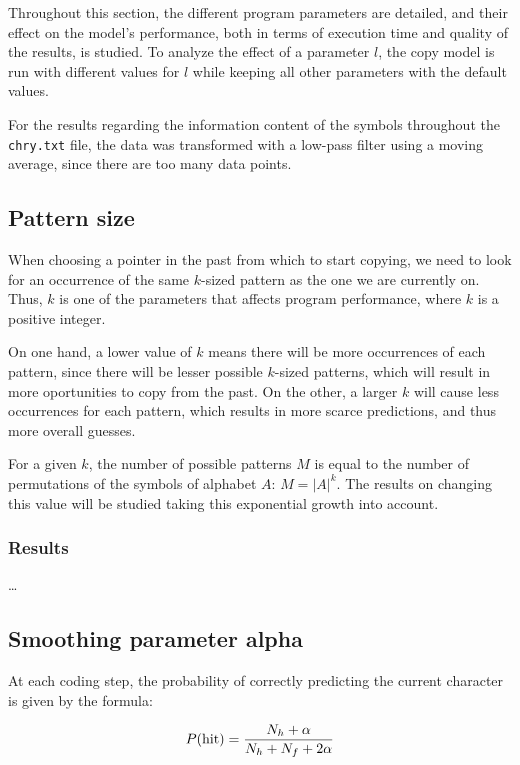 \documentclass{article}
\begin{document}
Throughout this section, the different program parameters are detailed, and their effect on the model's performance, both in terms of execution time and quality of the results, is studied.
To analyze the effect of a parameter $l$, the copy model is run with different values for $l$ while keeping all other parameters with the default values.

For the results regarding the information content of the symbols throughout the \verb|chry.txt| file, the data was transformed with a low-pass filter using a moving average, since there are too many data points.

\subsection{Pattern size}

When choosing a pointer in the past from which to start copying, we need to look for an occurrence of the same $k$-sized pattern as the one we are currently on.
Thus, $k$ is one of the parameters that affects program performance, where $k$ is a positive integer.

On one hand, a lower value of $k$ means there will be more occurrences of each pattern, since there will be lesser possible $k$-sized patterns, which will result in more oportunities to copy from the past.
On the other, a larger $k$ will cause less occurrences for each pattern, which results in more scarce predictions, and thus more overall guesses.

For a given $k$, the number of possible patterns $M$ is equal to the number of permutations of the symbols of alphabet $A$: $M = \vert A \vert ^ k$.
The results on changing this value will be studied taking this exponential growth into account.

\subsubsection{Results}

\dots

\subsection{Smoothing parameter alpha}

At each coding step, the probability of correctly predicting the current character is given by the formula:

$$
P(\textnormal{hit}) = \frac{N_h + \alpha}{N_h + N_f + 2\alpha}
$$
\end{document}
